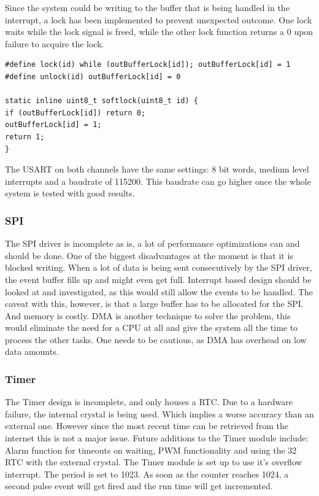 Since the system could be writing to the buffer that is being handled in the interrupt, a lock has been implemented to prevent unexpected outcome. One lock waits while the lock signal is freed, while the other lock function returns a 0 upon failure to acquire the lock.
\begin{verbatim}
#define lock(id) while (outBufferLock[id]); outBufferLock[id] = 1
#define unlock(id) outBufferLock[id] = 0

static inline uint8_t softlock(uint8_t id) {
if (outBufferLock[id]) return 0;
outBufferLock[id] = 1;
return 1;
}
\end{verbatim}
The USART on both channels have the same settings: 8 bit words, medium level interrupts and a baudrate of 115200. This baudrate can go higher once the whole system is tested with good results.
\subsubsection{SPI}
The SPI driver is incomplete as is, a lot of performance optimizations can and should be done. One of the biggest disadvantages at the moment is that it is blocked writing. When a lot of data is being sent consecutively by the SPI driver, the event buffer fills up and might even get full. Interrupt based design should be looked at and investigated, as this would still allow the events to be handled. The caveat with this, however, is that a large buffer has to be allocated for the SPI. And memory is costly. DMA is another technique to solve the problem, this would eliminate the need for a CPU at all and give the system all the time to process the other tasks. One needs to be cautious, as DMA has overhead on low data amounts.
\subsubsection{Timer}
The Timer design is incomplete, and only houses a RTC. Due to a hardware failure, the internal crystal is being used. Which implies a worse accuracy than an external one. However since the most recent time can be retrieved from the internet this is not a major issue. Future additions to the Timer module include: Alarm function for timeouts on waiting, PWM functionality and using the 32 RTC with the external crystal. The Timer module is set up to use it's overflow interrupt. The period is set to 1023. As soon as the counter reaches 1024, a second pulse event will get fired and the run time will get incremented.

